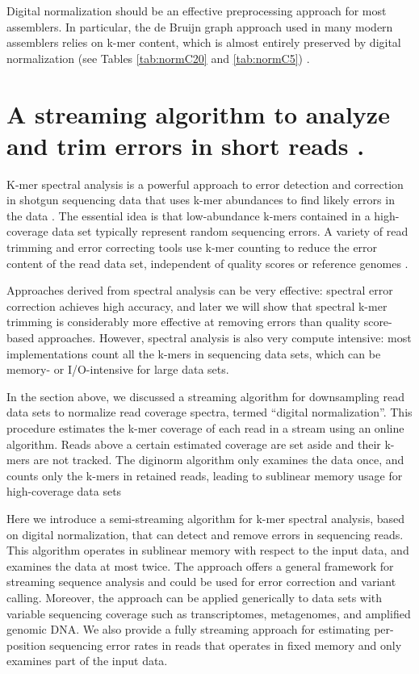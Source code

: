 Digital normalization should be an effective preprocessing approach for most
assemblers.  In particular, the de Bruijn graph approach used in many modern
assemblers relies on k-mer content, which is almost entirely preserved by
digital normalization (see Tables \ref{tab:normC20} and \ref{tab:normC5})
\cite{pubmed20211242}.




\section{A streaming algorithm to analyze and trim errors in short reads .}


K-mer spectral analysis is a powerful approach to error detection and
correction in shotgun sequencing data that uses k-mer abundances to
find likely errors in the data \cite{Pevzner2001,Li2003}. 
 The essential idea
is that low-abundance k-mers contained in a high-coverage data set typically
represent random sequencing errors.
A variety of read trimming and error correcting tools use k-mer counting to
reduce the error content of the read data set, independent of quality scores or
reference genomes \cite{Kelley2010}. 

Approaches derived
from spectral analysis can be very effective: spectral error
correction achieves high accuracy, and later we will show that
spectral k-mer trimming is considerably more effective at removing
errors than quality score-based approaches.
However, spectral analysis is also very
compute intensive: most implementations count all the k-mers in
sequencing data sets, which can be memory- or I/O-intensive for large
data sets.

In the section above, we discussed a streaming algorithm for downsampling
read data sets to normalize read coverage spectra, termed ``digital
normalization''.  This procedure
estimates the k-mer coverage of each read in a stream using an online
algorithm. Reads above a certain estimated coverage are set aside and
their k-mers are not tracked.  The diginorm algorithm only examines
the data once, and counts only the k-mers in retained reads, leading
to sublinear memory usage for high-coverage data sets

Here we introduce a semi-streaming algorithm for k-mer spectral
analysis, based on digital normalization, that can detect and remove
errors in sequencing reads.  This algorithm operates in sublinear
memory with respect to the input data, and examines the data at most
twice.  The approach offers a general framework for streaming sequence
analysis and could be used for error correction and variant calling.
Moreover, the approach can be applied generically to data sets with
variable sequencing coverage such as transcriptomes, metagenomes, and
amplified genomic DNA.  We also provide a fully streaming approach for
estimating per-position sequencing error rates in reads that operates
in fixed memory and only examines part of the input data.


